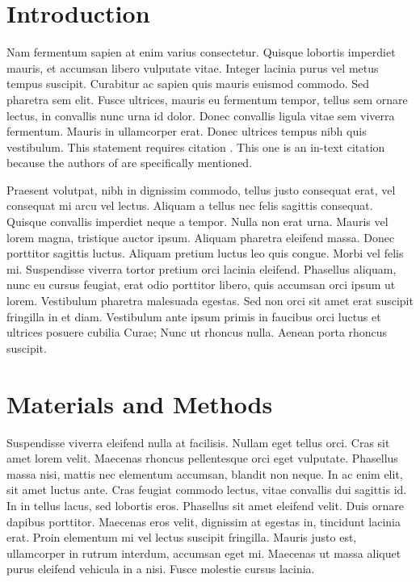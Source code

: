 \documentclass[draft,jgrga]{AGUTeX}
\begin{document}
\begin{article}

\section{Introduction}

Nam fermentum sapien at enim varius consectetur. Quisque lobortis imperdiet mauris, et accumsan libero vulputate vitae. Integer lacinia purus vel metus tempus suscipit. Curabitur ac sapien quis mauris euismod commodo. Sed pharetra sem elit. Fusce ultrices, mauris eu fermentum tempor, tellus sem ornare lectus, in convallis nunc urna id dolor. Donec convallis ligula vitae sem viverra fermentum. Mauris in ullamcorper erat. Donec ultrices tempus nibh quis vestibulum. This statement requires citation \citep{AtkinsonSloan}. This one is an in-text citation because the authors of \citet{ColtonKress1} are specifically mentioned.

Praesent volutpat, nibh in dignissim commodo, tellus justo consequat erat, vel consequat mi arcu vel lectus. Aliquam a tellus nec felis sagittis consequat. Quisque convallis imperdiet neque a tempor. Nulla non erat urna. Mauris vel lorem magna, tristique auctor ipsum. Aliquam pharetra eleifend massa. Donec porttitor sagittis luctus. Aliquam pretium luctus leo quis congue. Morbi vel felis mi. Suspendisse viverra tortor pretium orci lacinia eleifend. Phasellus aliquam, nunc eu cursus feugiat, erat odio porttitor libero, quis accumsan orci ipsum ut lorem. Vestibulum pharetra malesuada egestas. Sed non orci sit amet erat suscipit fringilla in et diam. Vestibulum ante ipsum primis in faucibus orci luctus et ultrices posuere cubilia Curae; Nunc ut rhoncus nulla. Aenean porta rhoncus suscipit.


\section{Materials and Methods}

Suspendisse viverra eleifend nulla at facilisis. Nullam eget tellus orci. Cras sit amet lorem velit. Maecenas rhoncus pellentesque orci eget vulputate. Phasellus massa nisi, mattis nec elementum accumsan, blandit non neque. In ac enim elit, sit amet luctus ante. Cras feugiat commodo lectus, vitae convallis dui sagittis id. In in tellus lacus, sed lobortis eros. Phasellus sit amet eleifend velit. Duis ornare dapibus porttitor. Maecenas eros velit, dignissim at egestas in, tincidunt lacinia erat. Proin elementum mi vel lectus suscipit fringilla. Mauris justo est, ullamcorper in rutrum interdum, accumsan eget mi. Maecenas ut massa aliquet purus eleifend vehicula in a nisi. Fusce molestie cursus lacinia. 


\end{article}
\end{document}
